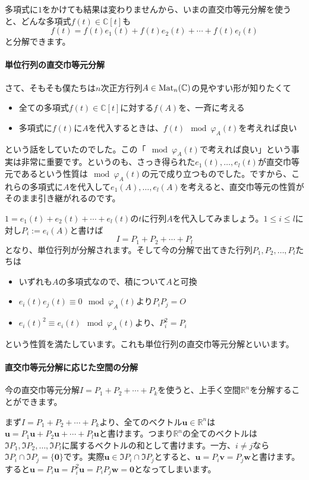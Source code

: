 多項式に$1$をかけても結果は変わりませんから、いまの直交巾等元分解を使うと、どんな多項式$f(t) \in \mathbb{C}[t]$も
\[
f(t) = f(t) e_1(t) + f(t) e_2(t) + \cdots + f(t) e_l(t)
\]
と分解できます。

\paragraph{単位行列の直交巾等元分解}

さて、そもそも僕たちは$n$次正方行列$A \in \operatorname{Mat}_n(\mathbb{C})$の見やすい形が知りたくて
\begin{itemize}
\item 全ての多項式$f(t) \in \mathbb{C}[t]$に対する$f(A)$を、一斉に考える
\item 多項式に$f(t)$に$A$を代入するときは、$f(t) \mod \varphi_A(t)$を考えれば良い
\end{itemize}
という話をしていたのでした。この「$\!\!\mod \varphi_A(t)$で考えれば良い」という事実は非常に重要です。というのも、さっき得られた$e_1(t), \ldots, e_l(t)$が直交巾等元であるという性質は$\!\!\mod \varphi_A(t)$の元で成り立つものでした。ですから、これらの多項式に$A$を代入して$e_1(A), \ldots, e_l(A)$を考えると、直交巾等元の性質がそのまま引き継がれるのです。

$1 = e_1(t) + e_2(t) + \cdots + e_l(t)$の$t$に行列$A$を代入してみましょう。$1 \leq i \leq l$に対し$P_i := e_i(A)$と書けば
\[
I = P_1 + P_2 + \cdots + P_l
\]
となり、単位行列が分解されます。そして今の分解で出てきた行列$P_1, P_2, \ldots, P_l$たちは
\begin{itemize}
\item いずれも$A$の多項式なので、積について$A$と可換
\item $e_i(t) e_j(t) \equiv 0 \mod \varphi_A(t)$より$P_i P_j = O$
\item $e_i(t)^2 \equiv e_i(t) \mod \varphi_A(t)$より、$P_i^2 = P_i$
\end{itemize}
という性質を満たしています。これも単位行列の直交巾等元分解といいます。

\paragraph{直交巾等元分解に応じた空間の分解}

今の直交巾等元分解$I = P_1 + P_2 + \cdots + P_k$を使うと、上手く空間$\mathbb{R}^n$を分解することができます。

まず$I = P_1 + P_2 + \cdots + P_k$より、全てのベクトル$\bm{u} \in \mathbb{R}^n$は$\bm{u} = P_1\bm{u} + P_2\bm{u} + \cdots + P_l\bm{u}$と書けます。つまり$\mathbb{R}^n$の全てのベクトルは$\Im P_1, \Im P_2, \ldots, \Im P_l$に属するベクトルの和として書けます。一方、$i \neq j$なら$\Im P_i \cap \Im P_j = \{\bm{0}\}$です。実際$\bm{u} \in \Im P_i \cap \Im P_j$とすると、$\bm{u} = P_i \bm{v} = P_j \bm{w}$と書けます。すると$\bm{u} = P_i \bm{u} = P_i^2 \bm{u} = P_i P_j \bm{w} = \bm{0}$となってしまいます。

